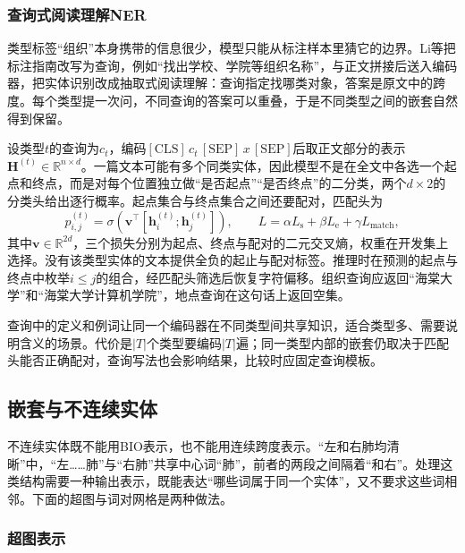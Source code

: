 \subsubsection{查询式阅读理解NER}
\label{sec:nlp-extraction-mrc-ner}

类型标签“组织”本身携带的信息很少，模型只能从标注样本里猜它的边界。Li等把标注指南改写为查询，例如“找出学校、学院等组织名称”，与正文拼接后送入编码器，把实体识别改成抽取式阅读理解：查询指定找哪类对象，答案是原文中的跨度。每个类型提一次问，不同查询的答案可以重叠，于是不同类型之间的嵌套自然得到保留。

设类型$t$的查询为$c_t$，编码$[\mathrm{CLS}]\,c_t\,[\mathrm{SEP}]\,x\,[\mathrm{SEP}]$后取正文部分的表示$\bm H^{(t)}\in\mathbb R^{n\times d}$。一篇文本可能有多个同类实体，因此模型不是在全文中各选一个起点和终点，而是对每个位置独立做“是否起点”“是否终点”的二分类，两个$d\times2$的分类头给出逐行概率。起点集合与终点集合之间还要配对，匹配头为
\begin{equation}
  p_{i,j}^{(t)}=\sigma\!\left(
  \bm v^{\top}[\bm h^{(t)}_i;\bm h^{(t)}_j]\right),
  \qquad
  L=\alpha L_{\mathrm{s}}+\beta L_{\mathrm{e}}+\gamma L_{\mathrm{match}},
  \label{eq:nlp-extraction-mrc}
\end{equation}
其中$\bm v\in\mathbb R^{2d}$，三个损失分别为起点、终点与配对的二元交叉熵，权重在开发集上选择。没有该类型实体的文本提供全负的起止与配对标签。推理时在预测的起点与终点中枚举$i\leq j$的组合，经匹配头筛选后恢复字符偏移。组织查询应返回“海棠大学”和“海棠大学计算机学院”，地点查询在这句话上返回空集。

查询中的定义和例词让同一个编码器在不同类型间共享知识，适合类型多、需要说明含义的场景。代价是$|T|$个类型要编码$|T|$遍；同一类型内部的嵌套仍取决于匹配头能否正确配对，查询写法也会影响结果，比较时应固定查询模板。

\subsection{嵌套与不连续实体}
\label{sec:nlp-extraction-ner-nested}

不连续实体既不能用BIO表示，也不能用连续跨度表示。“左和右肺均清晰”中，“左……肺”与“右肺”共享中心词“肺”，前者的两段之间隔着“和右”。处理这类结构需要一种输出表示，既能表达“哪些词属于同一个实体”，又不要求这些词相邻。下面的超图与词对网格是两种做法。

\subsubsection{超图表示}
\label{sec:nlp-extraction-hypergraph}

